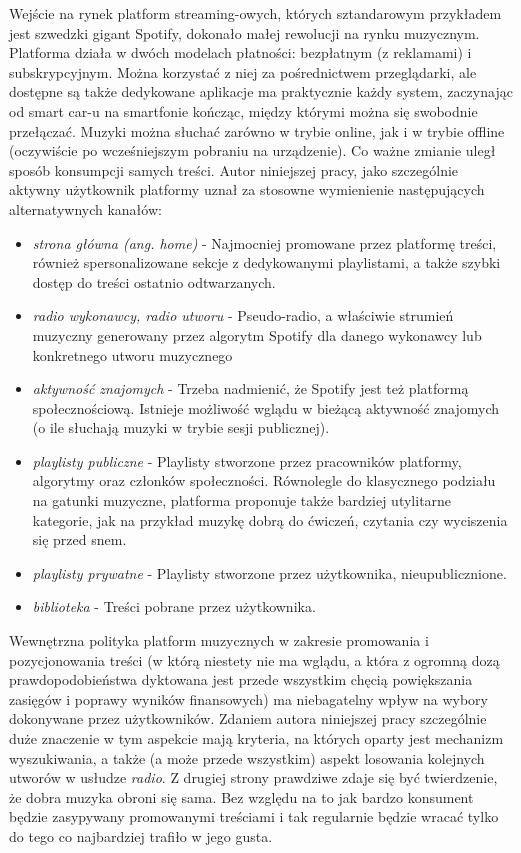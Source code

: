 \documentclass[a4paper,11pt]{article}
\begin{document}
    Wejście na rynek platform streaming-owych, których sztandarowym przykładem jest szwedzki gigant Spotify, dokonało małej rewolucji na rynku muzycznym. Platforma działa w dwóch modelach płatności: bezpłatnym (z reklamami) i subskrypcyjnym. Można korzystać z niej za pośrednictwem przeglądarki, ale dostępne są także dedykowane aplikacje ma praktycznie każdy system, zaczynając od smart car-u na smartfonie kończąc, między którymi można się swobodnie przełączać. Muzyki można słuchać zarówno w trybie online, jak i w trybie offline (oczywiście po wcześniejszym pobraniu na urządzenie). Co ważne zmianie uległ sposób konsumpcji samych treści. Autor niniejszej pracy, jako szczególnie aktywny użytkownik platformy uznał za stosowne wymienienie następujących alternatywnych kanałów:
    \begin{itemize}
        \item \textit{strona główna (ang. home)} - Najmocniej promowane przez platformę treści, również spersonalizowane sekcje z dedykowanymi playlistami, a także szybki dostęp do treści ostatnio odtwarzanych.
        \item \textit{radio wykonawcy, radio utworu} - Pseudo-radio, a właściwie strumień muzyczny generowany przez algorytm Spotify dla danego wykonawcy lub konkretnego utworu muzycznego
        \item \textit{aktywność znajomych} - Trzeba nadmienić, że Spotify jest też platformą społecznościową. Istnieje możliwość wglądu w bieżącą aktywność znajomych (o ile słuchają muzyki w trybie sesji publicznej).
        \item \textit{playlisty publiczne} - Playlisty stworzone przez pracowników platformy, algorytmy oraz członków społeczności. Równolegle do klasycznego podziału na gatunki muzyczne, platforma proponuje także bardziej utylitarne kategorie, jak na przykład muzykę dobrą do ćwiczeń, czytania czy wyciszenia się przed snem.
        \item \textit{playlisty prywatne} - Playlisty stworzone przez użytkownika, nieupublicznione.
        \item \textit{biblioteka} - Treści pobrane przez użytkownika.
    \end{itemize}

    \bigskip

    Wewnętrzna polityka platform muzycznych w zakresie promowania i pozycjonowania treści (w którą niestety nie ma wglądu, a która z ogromną dozą prawdopodobieństwa dyktowana jest przede wszystkim chęcią powiększania zasięgów i poprawy wyników finansowych) ma niebagatelny wpływ na wybory dokonywane przez użytkowników\cite{PreferencjeMuzyczneWCzasachSteamingu2020}. Zdaniem autora niniejszej pracy szczególnie duże znaczenie w tym aspekcie mają kryteria, na których oparty jest mechanizm wyszukiwania, a także (a może przede wszystkim) aspekt losowania kolejnych utworów w usłudze \textit{radio}. Z drugiej strony prawdziwe zdaje się być twierdzenie, że dobra muzyka obroni się sama. Bez względu na to jak bardzo konsument będzie zasypywany promowanymi treściami i tak regularnie będzie wracać tylko do tego co najbardziej trafiło w jego gusta.
\end{document}
